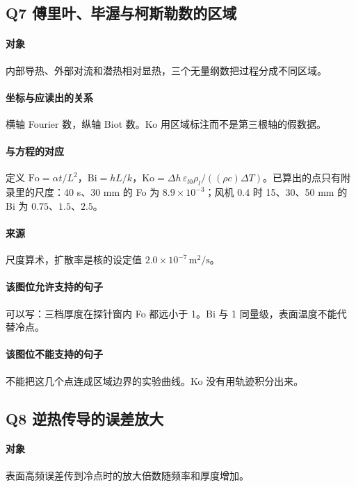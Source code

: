 \subsection{Q7 傅里叶、毕渥与柯斯勒数的区域}
\paragraph{对象}
内部导热、外部对流和潜热相对显热，三个无量纲数把过程分成不同区域。

\paragraph{坐标与应读出的关系}
横轴 Fourier 数，纵轴 Biot 数。Ko 用区域标注而不是第三根轴的假数据。

\paragraph{与方程的对应}
定义 $\mathrm{Fo}=\alpha t/L^2$，$\mathrm{Bi}=hL/k$，$\mathrm{Ko}=\Delta h\,\varepsilon_{l0}\rho_l/((\rho c)\Delta T)$。已算出的点只有附录里的尺度：40 s、30 mm 的 Fo 为 $8.9\times 10^{-3}$；风机 $0.4$ 时 15、30、50 mm 的 Bi 为 $0.75$、$1.5$、$2.5$。

\paragraph{来源}
尺度算术，扩散率是核的设定值 $2.0\times 10^{-7}\,\mathrm{m}^2/\mathrm{s}$。

\paragraph{该图位允许支持的句子}
可以写：三档厚度在探针窗内 Fo 都远小于 1。Bi 与 1 同量级，表面温度不能代替冷点。

\paragraph{该图位不能支持的句子}
不能把这几个点连成区域边界的实验曲线。Ko 没有用轨迹积分出来。

\subsection{Q8 逆热传导的误差放大}
\paragraph{对象}
表面高频误差传到冷点时的放大倍数随频率和厚度增加。

